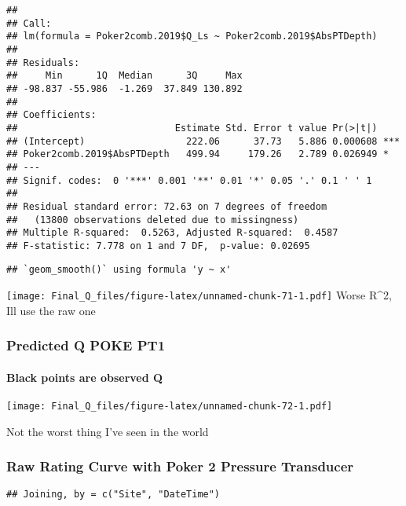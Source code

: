 \documentclass[
]{article}
\begin{document}
\begin{verbatim}
## 
## Call:
## lm(formula = Poker2comb.2019$Q_Ls ~ Poker2comb.2019$AbsPTDepth)
## 
## Residuals:
##     Min      1Q  Median      3Q     Max 
## -98.837 -55.986  -1.269  37.849 130.892 
## 
## Coefficients:
##                            Estimate Std. Error t value Pr(>|t|)    
## (Intercept)                  222.06      37.73   5.886 0.000608 ***
## Poker2comb.2019$AbsPTDepth   499.94     179.26   2.789 0.026949 *  
## ---
## Signif. codes:  0 '***' 0.001 '**' 0.01 '*' 0.05 '.' 0.1 ' ' 1
## 
## Residual standard error: 72.63 on 7 degrees of freedom
##   (13800 observations deleted due to missingness)
## Multiple R-squared:  0.5263, Adjusted R-squared:  0.4587 
## F-statistic: 7.778 on 1 and 7 DF,  p-value: 0.02695
\end{verbatim}

\begin{verbatim}
## `geom_smooth()` using formula 'y ~ x'
\end{verbatim}

\texttt{[image: Final\_Q\_files/figure-latex/unnamed-chunk-71-1.pdf]}
Worse R\^{}2, Ill use the raw one

\hypertarget{predicted-q-poke-pt1}{%
\subsubsection{Predicted Q POKE PT1}\label{predicted-q-poke-pt1}}

\hypertarget{black-points-are-observed-q-7}{%
\paragraph{Black points are observed
Q}\label{black-points-are-observed-q-7}}

\texttt{[image: Final\_Q\_files/figure-latex/unnamed-chunk-72-1.pdf]}

Not the worst thing I've seen in the world

\hypertarget{raw-rating-curve-with-poker-2-pressure-transducer}{%
\subsubsection{Raw Rating Curve with Poker 2 Pressure
Transducer}\label{raw-rating-curve-with-poker-2-pressure-transducer}}

\begin{verbatim}
## Joining, by = c("Site", "DateTime")
\end{verbatim}
\end{document}
